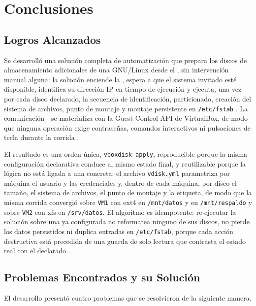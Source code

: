 \section{Conclusiones}

\subsection{Logros Alcanzados}

Se desarrolló una solución completa de automatización que prepara los discos de almacenamiento adicionales de una \vm{} GNU/Linux desde el \host{}, sin intervención manual alguna: la solución enciende la \vm{}, espera a que el sistema invitado esté disponible, identifica su dirección IP en tiempo de ejecución y ejecuta, una vez por cada disco declarado, la secuencia de identificación, particionado, creación del sistema de archivos, punto de montaje y montaje persistente en \texttt{/etc/fstab} \parencite{linux_storage_management, uuid_fstab}. La comunicación \host{}-\vm{} se materializa con la Guest Control API de VirtualBox, de modo que ninguna operación exige contraseñas, comandos interactivos ni pulsaciones de tecla durante la corrida \parencite{virtualbox_guestcontrol}.

El resultado es una orden única, \texttt{vboxdisk apply}, reproducible porque la misma configuración declarativa conduce al mismo estado final, y reutilizable porque la lógica no está ligada a una \vm{} concreta: el archivo \texttt{vdisk.yml} parametriza por máquina el usuario y las credenciales y, dentro de cada máquina, por disco el tamaño, el sistema de archivos, el punto de montaje y la etiqueta, de modo que la misma corrida convergió sobre \texttt{VM1} con ext4 en \texttt{/mnt/datos} y en \texttt{/mnt/respaldo} y sobre \texttt{VM2} con xfs en \texttt{/srv/datos}. El algoritmo es idempotente: re-ejecutar la solución sobre una \vm{} ya configurada no reformatea ninguno de sus discos, no pierde los datos persistidos ni duplica entradas en \texttt{/etc/fstab}, porque cada acción destructiva está precedida de una guarda de solo lectura que contrasta el estado real con el declarado \parencite{idempotency_concept}.

\subsection{Problemas Encontrados y su Solución}

El desarrollo presentó cuatro problemas que se resolvieron de la siguiente manera.

